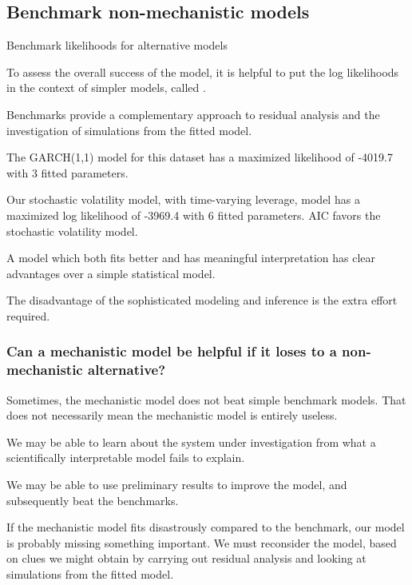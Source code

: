 \subsection{Benchmark non-mechanistic models}

\begin{frame}[fragile]{Benchmark likelihoods for alternative models}

\bi

\item To assess the overall success of the model, it is helpful to put the log likelihoods in the context of simpler models, called .

\item Benchmarks provide a complementary approach to residual analysis and the investigation of simulations from the fitted model.





\item The GARCH(1,1) model for this dataset has a maximized likelihood of -4019.7 with 3 fitted parameters.

\item Our stochastic volatility model, with time-varying leverage, model has a maximized log likelihood of -3969.4 with 6 fitted parameters.  AIC favors the stochastic volatility model.

\item A model which both fits better and has meaningful interpretation has clear advantages over a simple statistical model. 

\item The disadvantage of the sophisticated modeling and inference is the extra effort required.

\ei

\end{frame}

\begin{frame}[fragile]

\frametitle{Can a mechanistic model be helpful if it loses to a non-mechanistic alternative?}

\bi

\item Sometimes, the mechanistic model does not beat simple benchmark models. That does not necessarily mean the mechanistic model is entirely useless. 

\item We may be able to learn about the system under investigation from what a scientifically interpretable model fails to explain.

\item We may be able to use preliminary results to improve the model, and subsequently beat the benchmarks.

\item If the mechanistic model fits disastrously compared to the benchmark, our model is probably missing something important. We must reconsider the model, based on clues we might obtain by carrying out residual analysis and looking at simulations from the fitted model.

\ei

\end{frame}

